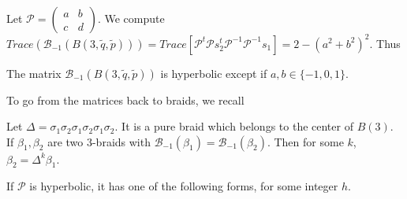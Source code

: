 \documentclass[12pt]{article}
\begin{document}
	Let ${\mathcal P}=\begin{pmatrix}
	a & b \\
	c & d 
	\end{pmatrix}$. We compute\\ 
	$Trace({\mathcal B}_{-1}(B(3,\tilde{q},\tilde{p})))=Trace[{\mathcal P}^t{\mathcal P}s_2^t{\mathcal P}^{-1}{\mathcal P}^{-1}s_1]=2-(a^2+b^2)^2$. Thus
	\begin{lem}
	The matrix ${\mathcal B}_{-1}(B(3,\tilde{q},\tilde{p}))$ is hyperbolic except if $a,b\in\{-1,0,1\}$.
	\end{lem}
To go from the matrices back to braids, we recall
\begin{prop} Let $\Delta=\sigma_1\sigma_2\sigma_1\sigma_2\sigma_1\sigma_2$. It is a pure braid which belongs to the center of $B(3)$. If $\beta_1,\beta_2$ are two $3$-braids with ${\mathcal B}_{-1}(\beta_1)={\mathcal B}_{-1}(\beta_2)$. Then for some $k$, $\beta_2=\Delta^k\beta_1$.
	\end{prop}
If ${\mathcal P}$ is hyperbolic, it
has one of the following forms, for some integer $h$.
\end{document}
